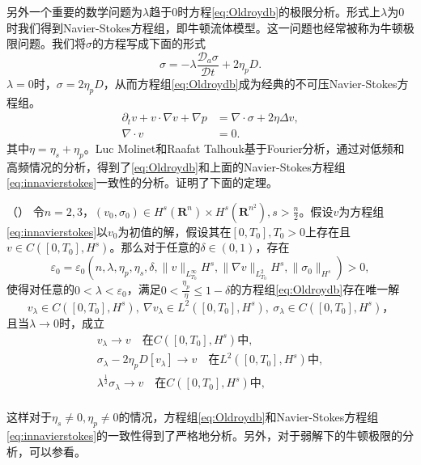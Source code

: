另外一个重要的数学问题为$\lambda$趋于$0$时方程\eqref{eq:Oldroydb}的极限分析。形式上$\lambda$为$0$时我们得到Navier-Stokes方程组，即牛顿流体模型。这一问题也经常被称为牛顿极限问题。我们将$\sigma$的方程写成下面的形式
\begin{equation*}
	 \sigma = -	\lambda \frac{\mathcal{D}_a \sigma}{\mathcal{D} t} +  2 \eta_p D.
\end{equation*}
$\lambda=0$时，$\sigma= 2 \eta_p D$，从而方程组\eqref{eq:Oldroydb}成为经典的不可压Navier-Stokes方程组。
\begin{subequations} \label{eq:innavierstokes}
\begin{align}
	\partial_t v + v \cdot \nabla v  + \nabla p &= \nabla \cdot \sigma + 2 \eta \Delta v, \\
	\nabla \cdot v &= 0.
\end{align}
\end{subequations}
其中$\eta= \eta_s + \eta_p$。Luc Molinet和Raafat Talhouk基于Fourier分析，通过对低频和高频情况的分析，得到了\eqref{eq:Oldroydb}和上面的Navier-Stokes方程组\eqref{eq:innavierstokes}一致性的分析。证明了下面的定理\cite{}。
\begin{theorem}（\cite{molinet2008newtonian}）
	令$n=2,3$，$(v_0,\sigma_0) \in H^s(\mathbf{R}^n) \times H^s(\mathbf{R}^{n^2}), s>\frac{n}{2}$。假设$v$为方程组\eqref{eq:innavierstokes}以$v_0$为初值的解，假设其在$[0,T_0],T_0>0$上存在且$v \in C([0,T_0],H^s)$。那么对于任意的$\delta \in (0,1)$，存在
	\begin{equation*}
		\varepsilon_0 = \varepsilon_0 (n,\lambda,\eta_p,\eta_s,\delta, \|v\|_{L_{T_0}^\infty}H^s, \|\nabla v\|_{L^2_{T_0}}H^s, \|\sigma_0\|_{H^s}) >0,
	\end{equation*}
	使得对任意的$0 < \lambda < \varepsilon_0$，满足$0 < \frac{\eta_p}{\eta} \le 1- \delta$的方程组\eqref{eq:Oldroydb}存在唯一解
	\begin{equation*}
		v_\lambda \in C([0,T_0],H^s),\ \nabla v_{\lambda} \in L^2([0,T_0],H^s), \ \sigma_{\lambda} \in C ([0,T_0],H^s)，
	\end{equation*}
	且当$\lambda \rightarrow 0$时，成立
	\begin{eqnarray*}
		v_\lambda \rightarrow v \quad \text{在} C([0,T_0],H^s) \text{中}, \\ 
		\sigma_\lambda - 2\eta_p D[v_\lambda]  \rightarrow v \quad \text{在} L^2([0,T_0],H^s) \text{中}, \\ 
		\lambda^{\frac{1}{2}} \sigma_\lambda \rightarrow v \quad \text{在} C([0,T_0],H^s) \text{中}, \\ 
	\end{eqnarray*}
\end{theorem}
这样对于$\eta_s \neq 0, \eta_p \neq 0$的情况，方程组\eqref{eq:Oldroydb}和Navier-Stokes方程组\eqref{eq:innavierstokes}的一致性得到了严格地分析。另外，对于弱解下的牛顿极限的分析，可以参看\cite{bresch2014newtonian}。


